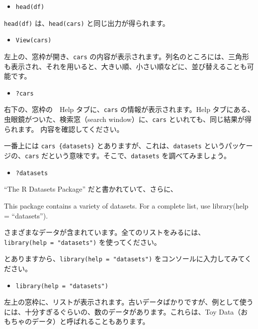 \documentclass[
]{bxjsbook}
\providecommand{\tightlist}{%
  \setlength{\itemsep}{0pt}\setlength{\parskip}{0pt}}
\theoremstyle{definition}
\theoremstyle{definition}
\theoremstyle{definition}
\theoremstyle{definition}
\theoremstyle{remark}
\begin{document}
\begin{itemize}
\tightlist
\item
  \texttt{head(df)}
\end{itemize}

\texttt{head(df)} は、\texttt{head(cars)} と同じ出力が得られます。

\begin{itemize}
\tightlist
\item
  \texttt{View(cars)}
\end{itemize}

左上の、窓枠が開き、\texttt{cars} の内容が表示されます。列名のところには、三角形も表示され、それを用いると、大きい順、小さい順などに、並び替えることも可能です。

\begin{itemize}
\tightlist
\item
  \texttt{?cars}
\end{itemize}

右下の、窓枠の　Help タブに、\texttt{cars} の情報が表示されます。Help タブにある、虫眼鏡がついた、検索窓（search window）に、\texttt{cars} といれても、同じ結果が得られます。
内容を確認してください。

一番上には \texttt{cars\ \{datasets\}} とありますが、これは、\texttt{datasets} というパッケージの、\texttt{cars} だという意味です。そこで、\texttt{datasets} を調べてみましょう。

\begin{itemize}
\tightlist
\item
  \texttt{?datasets}
\end{itemize}

``The R Datasets Package'' だと書かれていて、さらに、

This package contains a variety of datasets. For a complete list, use library(help = ``datasets'').

さまざまなデータが含まれています。全てのリストをみるには、\texttt{library(help\ =\ "datasets")} を使ってください。

とありますから、\texttt{library(help\ =\ "datasets")} をコンソールに入力してみてください。

\begin{itemize}
\tightlist
\item
  \texttt{library(help\ =\ "datasets")}
\end{itemize}

左上の窓枠に、リストが表示されます。古いデータばかりですが、例として使うには、十分すぎるぐらいの、数のデータがあります。これらは、Toy Data（おもちゃのデータ）と呼ばれることもあります。
\end{document}
